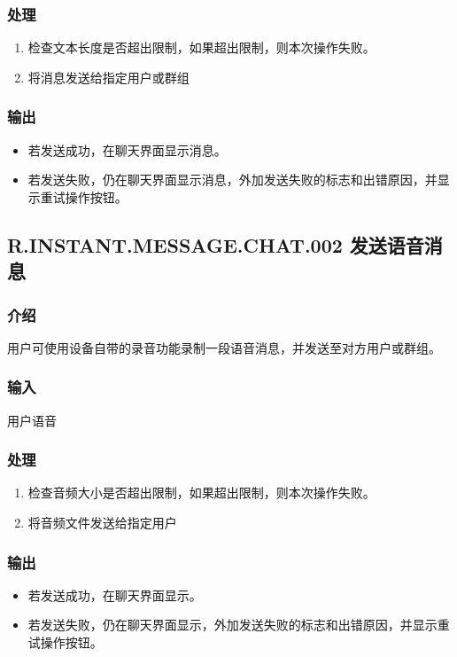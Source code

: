 \subsubsection{处理}
\begin{enumerate}
	\item 检查文本长度是否超出限制，如果超出限制，则本次操作失败。
	\item 将消息发送给指定用户或群组

	\end{enumerate}

\subsubsection{输出}
\begin{itemize}
	\item 若发送成功，在聊天界面显示消息。
	\item 若发送失败，仍在聊天界面显示消息，外加发送失败的标志和出错原因，并显示重试操作按钮。
	\end{itemize}
	

\subsection{R.INSTANT.MESSAGE.CHAT.002 发送语音消息}
\subsubsection{介绍}
用户可使用设备自带的录音功能录制一段语音消息，并发送至对方用户或群组。
\subsubsection{输入}
用户语音
\subsubsection{处理}
\begin{enumerate}
	\item 检查音频大小是否超出限制，如果超出限制，则本次操作失败。
	\item 将音频文件发送给指定用户
	\end{enumerate}
\subsubsection{输出}
\begin{itemize}
	\item 若发送成功，在聊天界面显示。
	\item 若发送失败，仍在聊天界面显示，外加发送失败的标志和出错原因，并显示重试操作按钮。
	\end{itemize}

